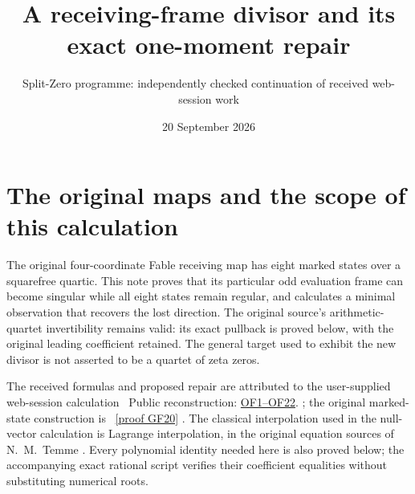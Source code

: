 \documentclass[11pt]{article}
\title{A receiving-frame divisor and its exact one-moment repair}
\author{Split-Zero programme: independently checked continuation of received web-session work}
\date{20 September 2026}
\begin{document}
\maketitle

\section{The original maps and the scope of this calculation}
The original four-coordinate Fable receiving map has eight marked states
over a squarefree quartic. This note proves that its particular odd
evaluation frame can become singular while all eight states remain
regular, and calculates a minimal observation that recovers the lost
direction. The original source's arithmetic-quartet invertibility
remains valid: its exact pullback is proved below, with the original
leading coefficient retained. The general target used to exhibit the
new divisor is not asserted to be a quartet of zeta zeros.

The received formulas and proposed repair are attributed to the
user-supplied web-session calculation \cite{Incoming}%
~Public reconstruction: \href{https://github.com/KokunoYumeto/zeta-function-research-reader/blob/689a8f87e9c12b7a99b01b3123438c6751ee608f/workbenches/splitzero-tandem/continuations/20260920-native-secular-frame/ODD_FRAME_REPAIR.tex\#L38}{OF1--OF22}.%
{}; the original
marked-state construction is \cite[SE1--14, GF20--21]{Fable}%
~\href{https://github.com/KokunoYumeto/zeta-function-research-reader/blob/5992ad50c0f2a06921f1fcaded7b4e38097c0739/workbenches/splitzero-tandem/continuations/20260920-original-kernel-mixed-determinants/providers/FABLE_TO_ORIGINAL_CONDUCTOR.tex\#L1598}{[proof GF20]}%
{}.
The classical interpolation used in the null-vector calculation is
Lagrange interpolation, in the original equation sources of
N.~M.~Temme \cite{Temme}. Every polynomial identity needed here is
also proved below; the accompanying exact rational script verifies
their coefficient equalities without substituting numerical roots.
\end{document}
